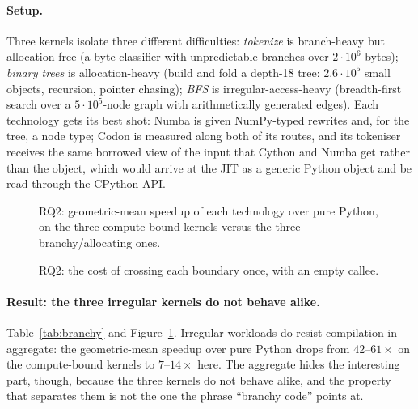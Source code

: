 \paragraph{Setup.} Three kernels isolate three different difficulties: \emph{tokenize} is
branch-heavy but allocation-free (a byte classifier with unpredictable branches over
$2\cdot10^6$ bytes); \emph{binary trees} is allocation-heavy (build and fold a depth-18
tree: $2.6\cdot10^5$ small objects, recursion, pointer chasing); \emph{BFS} is
irregular-access-heavy (breadth-first search over a $5\cdot10^5$-node graph with
arithmetically generated edges). Each technology gets its best shot: Numba is given
NumPy-typed rewrites and, for the tree, a  node type; Codon is measured along
both of its routes, and its tokeniser receives the same borrowed  view of the
input that Cython and Numba get rather than the  object, which would arrive at
the JIT as a generic Python object and be read through the CPython API.

\begin{table}[t]
  \centering
  \caption{RQ2: branchy, allocating and irregular-access kernels on CPython 3.14.6.}
  \label{tab:branchy}
  \small
  
\end{table}

\begin{figure}[t]
  \centering
  \caption{RQ2: geometric-mean speedup of each technology over pure Python, on the three
    compute-bound kernels versus the three branchy/allocating ones.}
  \label{fig:divergence}
\end{figure}

\begin{figure}[t]
  \centering
  \caption{RQ2: the cost of crossing each boundary once, with an empty callee.}
  \label{fig:ffi}
\end{figure}

\paragraph{Result: the three irregular kernels do not behave alike.}
Table~\ref{tab:branchy} and Figure~\ref{fig:divergence}. Irregular workloads do resist
compilation in aggregate: the geometric-mean speedup over pure Python drops from $42$--$61\times$
on the compute-bound kernels to $7$--$14\times$ here. The aggregate hides the interesting part,
though, because the three kernels do not behave alike, and the property that separates them is
not the one the phrase ``branchy code'' points at.

